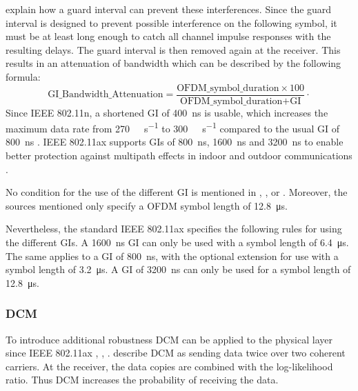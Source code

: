 \textcite{pulimamidi_development_2007} explain how a guard interval can prevent these interferences.
Since the guard interval is designed to prevent possible interference on the following symbol, it must be at least long enough to catch all channel impulse responses with the resulting delays.
The guard interval is then removed again at the receiver.
This results in an attenuation of bandwidth which can be described
by the following formula:
\begin{equation}\label{eq:GI}
   \text{GI\_Bandwidth\_Attenuation} =
   \frac{
      \text{OFDM\_symbol\_duration} \times 100
   }{
      \text{OFDM\_symbol\_duration} + \text{GI}
   }
   \cdot
\end{equation}
Since IEEE 802.11n, a shortened \ac{GI} of \SI{400}{\nano\second} is usable, which increases the
maximum data rate from \SI{270}{\mega\bit\per\second} to \SI{300}{\mega\bit\per\second} compared to
the usual \ac{GI} of \SI{800}{\nano\second} \cite{sauter_wireless_2022}.
IEEE 802.11ax supports \ac{GI}s of \SI{800}{\nano\second}, \SI{1600}{\nano\second} and \SI{3200}{\nano\second} to
enable better protection against multipath effects in indoor and outdoor communications \cite{deng_ieee_2017}.

No condition for the use of the different \ac{GI} is mentioned in \cite{deng_ieee_2017}, \cite{rochim_performance_2020} , \cite{mozaffariahrar_survey_2022} or \cite{afaqui_ieee_2017}.
Moreover, the sources mentioned only specify a \ac{OFDM} symbol length of \SI{12.8}{\micro\second}.

Nevertheless, the standard IEEE 802.11ax \cite{noauthor_ieee_2021} specifies the following rules for using the different \ac{GI}s.
A \SI{1600}{\nano\second} \ac{GI} can only be used with a symbol length of \SI{6.4}{\micro\second}.
The same applies to a \ac{GI} of \SI{800}{\nano\second}, with the optional extension for use with a symbol length of \SI{3.2}{\micro\second}.
A \ac{GI} of \SI{3200}{\nano\second} can only be used for a symbol length of \SI{12.8}{\micro\second}.
\subsubsection*{\acf{DCM}}
To introduce additional robustness \ac{DCM} can be applied to the physical layer since
IEEE 802.11ax \cite{jacob_system-level_2020}, \cite{triwinarko_phy_2021}, \cite{noauthor_ieee_2021}.
\textcite{jacob_system-level_2020} describe \ac{DCM} as sending data twice over two coherent carriers.
At the receiver, the data copies are combined with the log-likelihood ratio.
Thus \ac{DCM} increases the probability of receiving the data.

